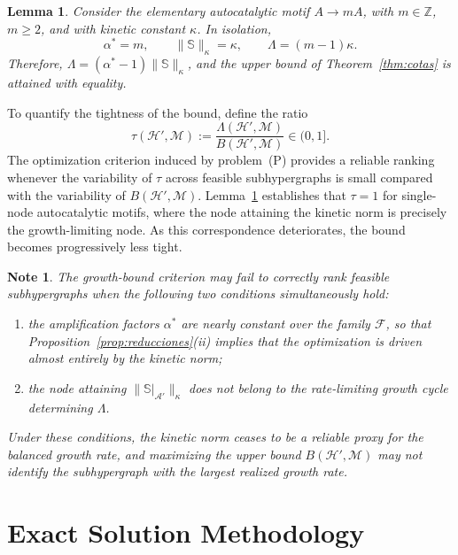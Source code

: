\documentclass[a4paper,11pt,reqno]{amsart}
\newtheorem{lemma}[definition]{Lemma}
\newtheorem{observation}[definition]{Note}
\begin{document}
\begin{lemma}
\label{lem:ajuste}
Consider the elementary autocatalytic motif $A\rightarrow mA$, with $m \in \mathbb Z$, $m\geq 2$, and
with kinetic constant $\kappa$. In isolation,
$$
\alpha^*=m,
\qquad
\|\mathbb{S}\|_{\kappa}=\kappa,
\qquad
\Lambda=(m-1)\kappa.
$$
Therefore, $\Lambda
=
(\alpha^*-1)
\|\mathbb{S}\|_{\kappa}$, 
and the upper bound of Theorem~\ref{thm:cotas} is attained with equality.
\end{lemma}

To quantify the tightness of the bound, define the ratio
$$
\tau(\mathcal{H}',\mathcal{M})
:=
\frac{\Lambda(\mathcal{H}',\mathcal{M})}
{B(\mathcal{H}',\mathcal{M})}
\in(0,1].
$$
The optimization criterion induced by problem~(P) provides a reliable
ranking whenever the variability of $\tau$ across feasible
subhypergraphs is small compared with the variability of
$B(\mathcal{H}',\mathcal{M})$. Lemma~\ref{lem:ajuste} establishes that
$\tau=1$ for single-node autocatalytic motifs, where the node attaining
the kinetic norm is precisely the growth-limiting node. As this
correspondence deteriorates, the bound becomes progressively less tight.

\begin{observation}
\label{obs:fallo}
The growth-bound criterion may fail to correctly rank feasible
subhypergraphs when the following two conditions simultaneously hold:
\begin{enumerate}
\item[(i)]
the amplification factors $\alpha^*$ are nearly constant over the family
$\mathcal{F}$, so that Proposition~\ref{prop:reducciones}(ii) implies
that the optimization is driven almost entirely by the kinetic norm;

\item[(ii)]
the node attaining
$\|\mathbb{S}|_{\mathcal{A}'}\|_{\kappa}$
does not belong to the rate-limiting growth cycle determining
$\Lambda$.
\end{enumerate}

Under these conditions, the kinetic norm ceases to be a reliable proxy
for the balanced growth rate, and maximizing the upper bound
$B(\mathcal{H}',\mathcal{M})$ may not identify the subhypergraph with the
largest realized growth rate.
\end{observation}
 
\section{Exact Solution Methodology}\label{sec:sweep}
\end{document}
